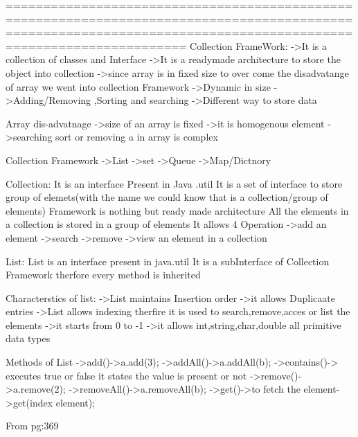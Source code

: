 {{{{{{{==================================================================================================================================================================
Collection FrameWork:
          ->It is a collection of classes and Interface
          ->It is a readymade architecture to store the object into collection
          ->since array is in fixed size to over come the disadvatange of array we went into collection Framework
          ->Dynamic in size 
          ->Adding/Removing ,Sorting and searching 
          ->Different way to store data

Array dis-advatnage
          ->size of an array is fixed
          ->it is homogenous element
          ->searching sort or removing a in array is complex

Collection Framework
                    ->List
                    ->set
                    ->Queue
                    ->Map/Dictnory

Collection:
          It is an interface
          Present in Java .util
          It is a set of interface to store group of elemets(with the name we could know that is a collection/group of elements) Framework is nothing but ready made architecture
          All the elements in a collection is stored in a group of elements
          It allows 4 Operation
                    ->add an element
                    ->search
                    ->remove
                    ->view an element in a collection

List:
          List is an interface present in java.util 
          It is a subInterface of Collection Framework
          therfore every method is inherited

Characterstics of list:
          ->List maintains Insertion order
          ->it allows Duplicaate entries
          ->List allows indexing therfire it is used to search,remove,acces or list the elements
          ->it starts from 0 to -1
          ->it allows int,string,char,double all primitive data types

Methods of List
           ->add()->a.add(3);
           ->addAll()->a.addAll(b);
           ->contains()-> executes true or false it states the value is present or not
           ->remove()->a.remove(2);
           ->removeAll()->a.removeAll(b);
           ->get()->to fetch the element->get(index element);          
          

          From pg:369

}}}}}}}
